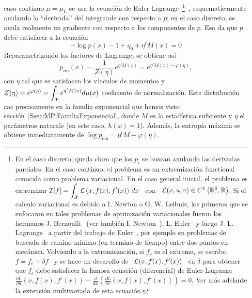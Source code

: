 caso continuo $\mu = \mu_L$ se usa la ecuaci\'on de Euler-Lagrange~\footnote{En
el caso  discreto, queda claro  que los $p_i$  se buscan anulando  las derivadas
parciales. En  el caso  continuo, el problema  es un  extremizaci\'on functional
conocida como problema variacional.  En el  caso general inicial, el problema es
extremizar $\displaystyle \mathcal{I}[f]  = \int_{\mathcal{X}} \mathcal{L}\left( x , f(x)  , f'(x) \right) \,
dx$ \ con  \ $\mathcal{L}(x,u,v) \in C^1\left(  \mathbb{R}^3 , \mathbb{R} \right)$.   Si el calculo
variacional  es debido  a I.   Newton o  G.  W.   Leibniz, los  primeros que  se
enfocaron en tales problemas de optimizaci\'on variacionales fueron los hermanos
J.      Bernoulli~\cite{Ber1697,     Ber1701,    Ber1718}     (ver     tambi\'en
I. Newton~\cite{New1696}),  L.  Euler~\cite{Eul1738,  Eul1744, Eul1766}  y luego
J. L.   Lagrange~\cite{Lag1760:1, Lag1760:2,  Lag1766} a  partir del  trabajo de
Euler~\cite{Gol80, Fra92, Fra94, BraSan07}, por  ejemplo en problemas de buscada
de   camino   m\'inimo   (en   termino   de  tiempo)   entre   dos   puntos   en
mec\'anica.  Volviendo  a  la  extremiezaci\'on,  si $f_e$  es  el  extremo,  se
escribe  \   $f  =  f_e   +  \delta  f$   \  y  se   hace  un  desarollo   de  \
$\mathcal{L}(x,f(x),f'(x))$  \ en  $\delta$ para  obtener  que $f_e$  debe satisfacer  la
famosa       ecuaci\'on       (diferencial)      de       Euler-Lagrange       \
$\displaystyle        \frac{\partial         L}{\partial        u}(x,f(x),f'(x))
- \frac{d}{dx}  \left(  \frac{\partial  L}{\partial v}(x,f(x),f'(x))  \right)  =
0$.    Ver    m\'as   adelante    la    extensi\'on    multivariada   de    esta
ecuaci\'on.\label{Foot:SZ:EulerLagrange}}~\cite{GelFom63,  Wei74, Bru04,  Cla13,
Kom14}, esquematicamente anulando la ``derivada''  del integrande con respecto a
$p$; en  el caso discreto,  se anula realmente un  gradiente con respecto  a los
componentes de $p$. Eso da que $p$ debe satisfacer a la ecuaci\'on
%
\[
- \log p(x) - 1 + \eta_0 + \eta^t M(x) = 0
\]
%
Reparametrizando los factores de Lagrange, se obtiene as\'i
%
\[
p_{\mathrm{em}}(x) = \frac{1}{Z(\eta)} e^{\eta^t M(x)} = e^{\eta^t M(x) - \varphi(\eta)},
\]
%
con $\eta$  tal que  se satisfacen  los v\'inculos  de momentos  y \  $Z(\eta) =
e^{\varphi(\eta)} =  \displaystyle \int_{\mathcal{X}} e^{\eta^t M(x)}  d\mu(x)$ coeficiente
de  normalizaci\'on.   Esta  distribuci\'on   cae  precisamente  en  la  familia
exponencial  que hemos  visto secci\'on~\ref{Ssec:MP:FamiliaExponencial},  donde
$M$ es  la estad\'istica suficiente y  $\eta$ el par\'ametros naturale  (en este
caso, $h(x) = 1$). Adem\'as, la entrop\'ia m\'axima se obtiene inmediatamente de
$\log p_{\mathrm{em}} = \eta^t M - \varphi(\eta)$.
%

